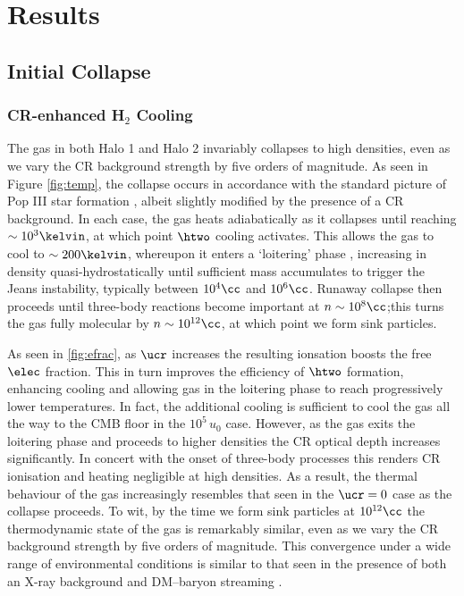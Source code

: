 \section{Results}
\label{sec:results}
\subsection{Initial Collapse}
\subsubsection{CR-enhanced H$_2$ Cooling}
\label{sec:initial_collapse}

The gas in both Halo 1 and Halo 2 invariably collapses to high densities, even as we vary the CR background strength by five orders of magnitude. As seen in Figure \ref{fig:temp}, the collapse occurs in accordance with the standard picture of Pop III star formation \citep[e.g.,][]{Greifetal2012,StacyBromm2013,Hiranoetal2014,Hosokawaetal2015}, albeit slightly modified by the presence of a CR background.  In each case, the gas heats adiabatically as it collapses until reaching $\sim10^3\kelvin$, at which point $\htwo$ cooling activates.  This allows the gas to cool to $\sim200\kelvin$, whereupon it enters a `loitering' phase \citep{BrommCoppiLarson2002}, increasing in density quasi-hydrostatically until sufficient mass accumulates to trigger the Jeans instability, typically between $10^4\cc$ and $10^6\cc$. Runaway collapse then proceeds until three-body reactions become important at $n\sim10^8\cc$;this turns the gas fully molecular by $n\sim10^{12}\cc$, at which point we form sink particles.

As seen in \ref{fig:efrac}, as $\ucr$ increases the resulting ionsation boosts the free $\elec$ fraction.  This in turn improves the efficiency of $\htwo$ formation, enhancing cooling and allowing gas in the loitering phase to reach progressively lower temperatures. In fact, the additional cooling is sufficient to cool the gas all the way to the CMB floor in the $10^5\,u_0$ case. However, as the gas exits the loitering phase and proceeds to higher densities the CR optical depth increases significantly. In concert with the onset of three-body processes this renders CR ionisation and heating negligible at high densities. As a result, the thermal behaviour of the gas increasingly resembles that seen in the $\ucr=0$ case as the collapse proceeds. To wit, by the time we form sink particles at  $10^{12}\cc$ the thermodynamic state of the gas is remarkably similar, even as we vary the CR background strength by five orders of magnitude. This convergence under a wide range of environmental conditions is similar to that seen in the presence of both an X-ray background \citep{Hummeletal2015} and DM--baryon streaming \citep{StacyBrommLoeb2011a,Greifetal2011b}.